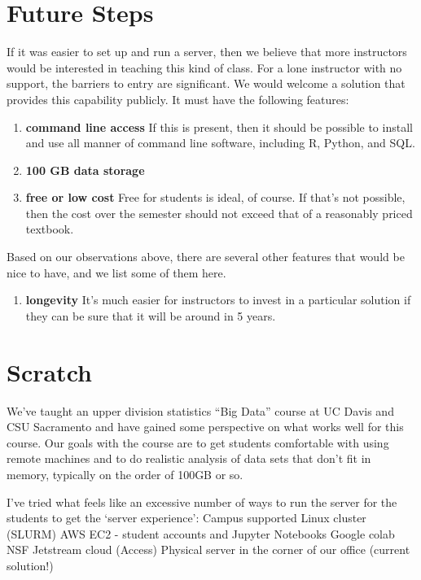 \documentclass[12pt]{article}
\begin{document}
\section{Future Steps}

If it was easier to set up and run a server, then we believe that more instructors would be interested in teaching this kind of class.
For a lone instructor with no support, the barriers to entry are significant.
We would welcome a solution that provides this capability publicly.
It must have the following features:
\begin{enumerate}
\item \textbf{command line access} If this is present, then it should be possible to install and use all manner of command line software, including R, Python, and SQL.
\item \textbf{100 GB data storage} 
\item \textbf{free or low cost} Free for students is ideal, of course.
    If that's not possible, then the cost over the semester should not exceed that of a reasonably priced textbook.
\end{enumerate}
Based on our observations above, there are several other features that would be nice to have, and we list some of them here.

\begin{enumerate}
\item \textbf{longevity} It's much easier for instructors to invest in a particular solution if they can be sure that it will be around in 5 years.
\end{enumerate}




\section{Scratch}

We've taught an upper division statistics ``Big Data'' course at UC Davis and CSU Sacramento and have gained some perspective on what works well for this course.
Our goals with the course are to get students comfortable with using remote machines and to do realistic analysis of data sets that don’t fit in memory, typically on the order of 100GB or so.
 
I’ve tried what feels like an excessive number of ways to run the server for the students to get the `server experience':
Campus supported Linux cluster (SLURM)
AWS EC2 - student accounts and Jupyter Notebooks
Google colab
NSF Jetstream cloud (Access)
Physical server in the corner of our office (current solution!)
\end{document}
